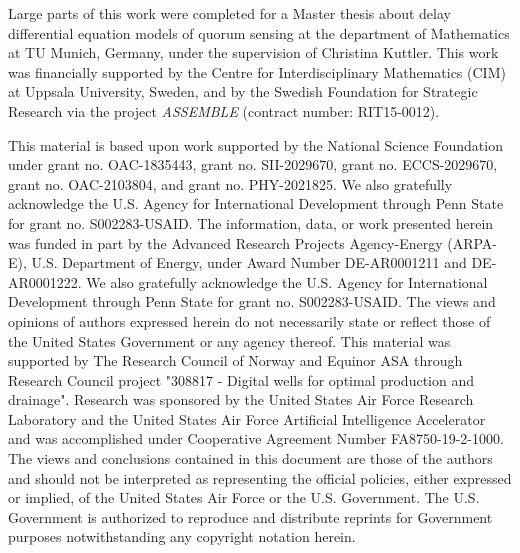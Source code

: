 \documentclass{juliacon}
\begin{document}
\begin{acks}

Large parts of this work were completed for a Master thesis about delay differential equation models of quorum sensing at the department of Mathematics at TU Munich, Germany, under the supervision of Christina Kuttler.
This work was financially supported by the Centre for Interdisciplinary Mathematics (CIM) at Uppsala University, Sweden, and by the Swedish Foundation for Strategic Research via the project \emph{ASSEMBLE} (contract number: RIT15-0012).

This material is based upon work supported by the National Science Foundation under grant no. OAC-1835443, grant no. SII-2029670, grant no. ECCS-2029670, grant no. OAC-2103804, and grant no. PHY-2021825. We also gratefully acknowledge the U.S. Agency for International Development through Penn State for grant no. S002283-USAID. The information, data, or work presented herein was funded in part by the Advanced Research Projects Agency-Energy (ARPA-E), U.S. Department of Energy, under Award Number DE-AR0001211 and DE-AR0001222. We also gratefully acknowledge the U.S. Agency for International Development through Penn State for grant no. S002283-USAID. The views and opinions of authors expressed herein do not necessarily state or reflect those of the United States Government or any agency thereof. This material was supported by The Research Council of Norway and Equinor ASA through Research Council project "308817 - Digital wells for optimal production and drainage". Research was sponsored by the United States Air Force Research Laboratory and the United States Air Force Artificial Intelligence Accelerator and was accomplished under Cooperative Agreement Number FA8750-19-2-1000. The views and conclusions contained in this document are those of the authors and should not be interpreted as representing the official policies, either expressed or implied, of the United States Air Force or the U.S. Government. The U.S. Government is authorized to reproduce and distribute reprints for Government purposes notwithstanding any copyright notation herein.

\end{acks}


\end{document}
